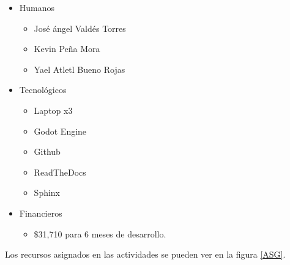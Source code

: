 \documentclass[]{article}
\begin{document}
\begin{itemize}
\item Humanos
\begin{itemize}
\item	Jos\'e \'angel Vald\'es Torres
\item	Kevin Pe\~na Mora
\item	Yael Atletl Bueno Rojas
\end{itemize}
\item	Tecnol\'ogicos

\begin{itemize}
\item	Laptop x3
\item	Godot Engine
\item	Github
\item	ReadTheDocs
\item	Sphinx
\end{itemize} 
\item	Financieros
\begin{itemize}
\item	 \$31,710 para 6 meses de desarrollo.
\end{itemize}
\end{itemize}

Los recursos asignados en las actividades se pueden ver en la figura \ref{ASG}.
\end{document}
